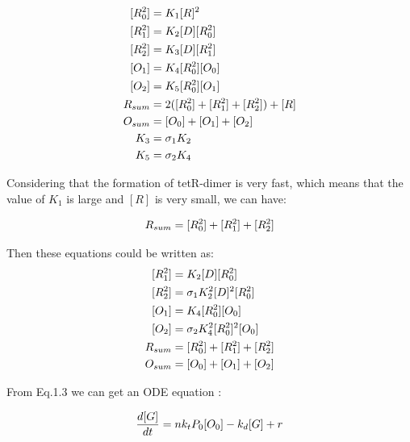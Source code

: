 \begin{equation} 
\begin{aligned} 
\centering
[R^2_0] &= K_1[R]^2 \\
[R^2_1] &= K_2[D][R^2_0] \\
[R^2_2] &= K_3[D][R^2_1] \\
[O_1]   &= K_4[R^2_0][O_0] \\
[O_2]   &= K_5[R^2_0][O_1] \\
R_{sum} &= 2([R_0^2]+[R_1^2]+[R_2^2])+[R] \\
O_{sum} &= [O_0]+[O_1]+[O_2] \\
K_{3} &= \sigma_{1} K_{2} \\
K_{5} &= \sigma_{2} K_{4} \\
\end{aligned} 
\end{equation}


Considering that the formation of tetR-dimer is very fast, which means that the value of $K_1$ is large and $[R]$ is very small, we can have:

\begin{equation} 
\begin{aligned} 
\centering
R_{sum} &= [R_0^2]+[R_1^2]+[R_2^2] \\
\end{aligned} 
\end{equation}

Then these equations could be written as:
\begin{equation} 
\begin{aligned} 
\centering
[R^2_1] &= K_2[D][R^2_0] \\
[R^2_2] &= \sigma_{1}K_2^2[D]^2[R^2_0] \\
[O_1]   &= K_4[R^2_0][O_0] \\
[O_2]   &= \sigma_{2}K_4^2[R^2_0]^2[O_0] \\
R_{sum} &= [R_0^2]+[R_1^2]+[R_2^2] \\
O_{sum} &= [O_0]+[O_1]+[O_2] \\
\end{aligned} 
\end{equation}

From Eq.1.3 we can get an ODE equation : 

\begin{equation*} 
\begin{aligned} 
\centering
\frac{d[G]}{dt} &= n k_t P_0 [O_0] - k_d[G] + r\\
\end{aligned} 
\end{equation*}

